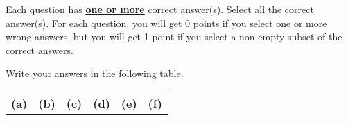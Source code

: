 
Each question has \underline{\textbf{one or more}} correct answer(s). Select all the correct answer(s). For each question, you will get 0 points if you select one or more wrong answers, but you will get 1 point if you select a non-empty subset of the correct answers.

Write your answers in the following table.


\begin{table}[htbp]
	\centering
	\begin{tabular}{|p{1.5cm}|p{1.5cm}|p{1.5cm}|p{1.5cm}|p{1.5cm}|p{1.5cm}|}
		\hline
		(a) & (b) & (c) & (d) & (e) & (f)  \\
		\hline
		    &     &     &     &     &          \\
		\hline
	\end{tabular}
\end{table}

